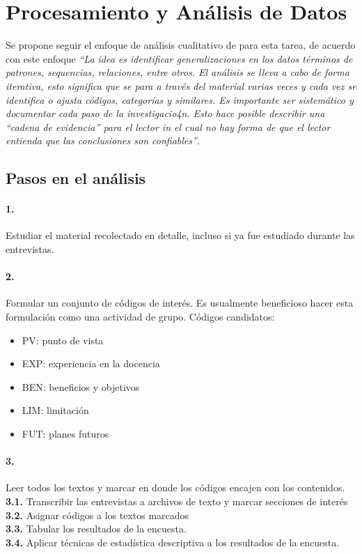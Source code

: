 \section{Procesamiento y Análisis de Datos}
Se propone seguir el enfoque de análisis cualitativo de \cite{runeson-et-al} para esta tarea, de acuerdo con este enfoque \emph{``La idea es identificar generalizaciones en los datos términos de patrones, sequencias, relaciones, entre otros. El análisis se lleva a cabo de forma iterativa, esto significa que se para a través del material varias veces y cada vez se identifica o ajusta códigos, categorías y similares. Es importante ser sistemático y documentar cada paso de la investigacio4n. Esto hace posible describir una ``cadena de evidencia'' para el lector in el cual no hay forma de que el lector entienda que las conclusiones son confiables''}.


\subsection{Pasos en el análisis}

\paragraph{1.} Estudiar el material recolectado en detalle, incluso si ya fue estudiado durante las entrevistas. 

\paragraph{2.} Formular un conjunto de códigos de interés. Es usualmente beneficioso hacer esta formulación como una actividad de grupo. Códigos candidatos:
\begin{center}
\begin{itemize}
    \item PV: punto de vista
    \item EXP: experiencia en la docencia
    \item BEN: beneficios y objetivos
    \item LIM: limitación
    \item FUT: planes futuros
\end{itemize}

\end{center}


\paragraph{3.} Leer todos los textos y marcar en donde los códigos encajen con los contenidos.\\
\textbf{3.1.} Transcribir las entrevistas a archivos de texto y marcar secciones de interés\\
\textbf{3.2.} Asignar códigos a los textos marcados \\
\textbf{3.3.} Tabular los resultados de la encuesta. \\
\textbf{3.4.} Aplicar técnicas de estadística descriptiva a los resultados de la encuesta.

